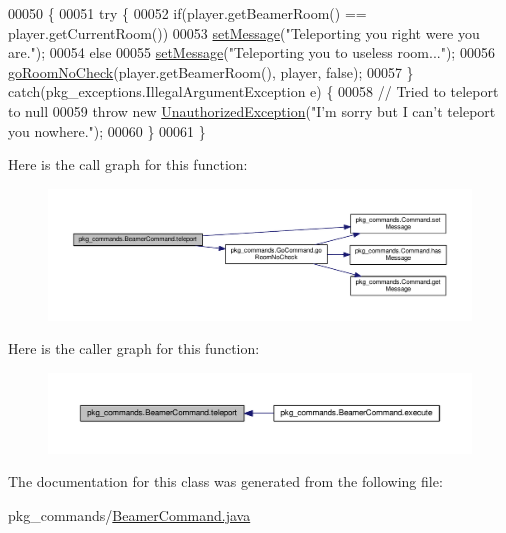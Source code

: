\begin{DoxyCode}
00050                                                                       \{
00051         \textcolor{keywordflow}{try} \{
00052             \textcolor{keywordflow}{if}(player.getBeamerRoom() == player.getCurrentRoom())
00053                 \hyperlink{classpkg__commands_1_1Command_ae210ff216fe908b111ba1c988a963d13}{setMessage}(\textcolor{stringliteral}{"Teleporting you right were you are."});
00054             \textcolor{keywordflow}{else}
00055                 \hyperlink{classpkg__commands_1_1Command_ae210ff216fe908b111ba1c988a963d13}{setMessage}(\textcolor{stringliteral}{"Teleporting you to useless room..."});
00056             \hyperlink{classpkg__commands_1_1GoCommand_a210afbc5f3ef34d3ad5759d853c8f8c2}{goRoomNoCheck}(player.getBeamerRoom(), player, \textcolor{keyword}{false});
00057         \} \textcolor{keywordflow}{catch}(pkg\_exceptions.IllegalArgumentException e) \{
00058             \textcolor{comment}{// Tried to teleport to null}
00059             \textcolor{keywordflow}{throw} \textcolor{keyword}{new} \hyperlink{classpkg__exceptions_1_1UnauthorizedException}{UnauthorizedException}(\textcolor{stringliteral}{"I'm sorry but I can't teleport you
       nowhere."});
00060         \}
00061     \}
\end{DoxyCode}


Here is the call graph for this function\-:\nopagebreak
\begin{figure}[H]
\begin{center}
\leavevmode
\includegraphics[width=350pt]{classpkg__commands_1_1BeamerCommand_a2b6c04242d443d4ff36f255b06ce14be_cgraph}
\end{center}
\end{figure}




Here is the caller graph for this function\-:\nopagebreak
\begin{figure}[H]
\begin{center}
\leavevmode
\includegraphics[width=350pt]{classpkg__commands_1_1BeamerCommand_a2b6c04242d443d4ff36f255b06ce14be_icgraph}
\end{center}
\end{figure}




The documentation for this class was generated from the following file\-:\begin{DoxyCompactItemize}
\item 
pkg\-\_\-commands/\hyperlink{BeamerCommand_8java}{Beamer\-Command.\-java}\end{DoxyCompactItemize}
